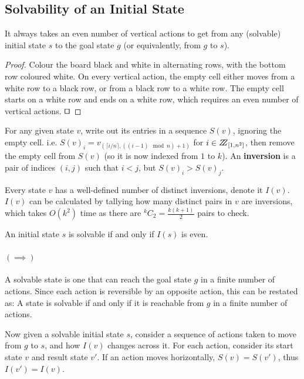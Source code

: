 \documentclass[runningheads]{llncs}
\begin{document}
\subsection{Solvability of an Initial State \cite{Solvability}}
\label{subsec:solvability}
\begin{lemma}\label{lem:evennumofvertactions}
It always takes an even number of vertical actions to get from any (solvable) initial state $s$ to the goal state $g$ (or equivalently, from $g$ to $s$).
\end{lemma}
\begin{proof}
Colour the board black and white in alternating rows, with the bottom row coloured white. On every vertical action, the empty cell either moves from a white row to a black row, or from a black row to a white row. The empty cell starts on a white row and ends on a white row, which requires an even number of vertical actions. $\qed$
\end{proof}

\begin{definition}\label{def:inversion}
For any given state $v$, write out its entries in a sequence $S(v)$, ignoring the empty cell. i.e. $S(v)_i = v_{(\lceil i/n\rceil, ((i-1) \mod n) +1)}$ for $i \in \bbbz_{[1,n^2]}$, then remove the empty cell from $S(v)$ (so it is now indexed from $1$ to $k$). An \textbf{inversion} is a pair of indices $(i,j)$ such that $i < j$, but $S(v)_i > S(v)_j$.
\end{definition}
Every state $v$ has a well-defined number of distinct inversions, denote it $I(v)$. $I(v)$ can be calculated by tallying how many distinct pairs in $v$ are inversions, which takes $O(k^2)$ time as there are $^kC_2 = \frac{k(k+1)}{2}$ pairs to check.

\begin{theorem}\label{thm:solvability}
An initial state $s$ is solvable if and only if $I(s)$ is even.
\end{theorem}
\paragraph{$(\implies)$}
A solvable state is one that can reach the goal state $g$ in a finite number of actions. Since each action is reversible by an opposite action, this can be restated as: A state is solvable if and only if it is reachable from $g$ in a finite number of actions.

Now given a solvable initial state $s$, consider a sequence of actions taken to move from $g$ to $s$, and how $I(v)$ changes across it. For each action, consider its start state $v$ and result state $v'$. If an action moves horizontally, $S(v) = S(v')$, thus $I(v') = I(v)$.
\end{document}
